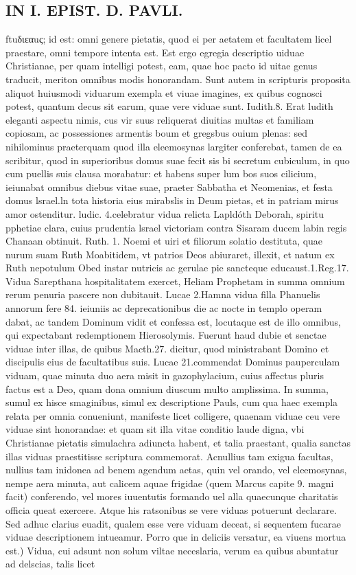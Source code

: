 \documentclass{article}
\begin{document}
\begin{pages}
\section*{IN I. EPIST. D. PAVLI. }
\marginpar{[ p.107 ]}\pstart ftuδιεαuς; id est: omni genere pietatis, quod ei per aetatem et facultatem licel praestare, omni tempore intenta est. Est ergo egregia descriptio uiduae Christianae, per quam intelligi potest, eam, quae hoc pacto id uitae genus traducit, meriton omnibus modis honorandam. Sunt autem in scripturis proposita aliquot huiusmodi viduarum exempla et viuae imagines, ex quibus cognosci potest, quantum decus sit earum, quae vere viduae sunt. Iudith.8. Erat ludith eleganti aspectu nimis, cus vir suus reliquerat diuitias multas et familiam copiosam, ac possessiones armentis boum et gregsbus ouium plenas: sed nihilominus praeterquam quod illa eleemosynas largiter conferebat, tamen de ea scribitur, quod in superioribus domus suae fecit sis bi secretum cubiculum, in quo cum puellis suis clausa morabatur: et habens super lum bos suos cilicium, ieiunabat omnibus diebus vitae suae, praeter Sabbatha et Neomenias, et festa domus lsrael.ln tota historia eius mirabslis in Deum pietas, et in patriam mirus amor ostenditur. ludic. 4.celebratur vidua relicta Lapldóth Deborah, spiritu pphetiae clara, cuius prudentia lsrael victoriam contra Sisaram ducem labin regis Chanaan obtinuit. Ruth. 1. Noemi et uiri et filiorum solatio destituta, quae nurum suam Ruth Moabitidem, vt patrios Deos abiuraret, illexit, et natum ex Ruth nepotulum Obed instar nutricis ac gerulae pie sancteque educaust.1.Reg.17. Vidua Sarepthana hospitalitatem exercet, Heliam Prophetam in summa omnium rerum penuria pascere non dubitauit. Lucae 2.Hamna vidua filla Phanuelis annorum fere 84. ieiuniis ac deprecationibus die ac nocte in templo operam dabat, ac tandem Dominum vidit et confessa est, locutaque est de illo omnibus, qui expectabant redemptionem Hierosolymis. Fuerunt haud dubie et senctae viduae inter illas, de quibus Macth.27. dicitur, quod ministrabant Domino et discipulis eius de facultatibus suis. Lucae 21.commendat Dominus pauperculam viduam, quae minuta duo aera misit in gazophylacium, cuius affectus pluris factus est a Deo, quam dona omnium diuscum multo amplissima. In summa, sumul ex hisce smaginibus, simul ex descriptione Pauls, cum qua haec exempla relata per omnia conueniunt, manifeste licet colligere, quaenam viduae ceu vere viduae sint honorandae: et quam sit illa vitae conditio laude digna, vbi Christianae pietatis simulachra adiuncta habent, et talia praestant, qualia sanctas illas viduas praestitisse scriptura commemorat. Acnullius tam exigua facultas, nullius tam inidonea ad benem agendum aetas, quin vel orando, vel eleemosynas, nempe aera minuta, aut calicem aquae frigidae (quem Marcus capite 9. magni facit) conferendo, vel mores iuuentutis formando uel alla quaecunque charitatis officia queat exercere. Atque his ratsonibus se vere viduas potuerunt declarare. Sed adhuc clarius euadit, qualem esse vere viduam deceat, si sequentem fucarae viduae descriptionem intueamur.  \pend\pstart Porro que in deliciis versatur, ea viuens mortua est.) Vidua, cui adsunt non solum viltae neceslaria, verum ea quibus abuntatur ad delscias, talis licet 
\end{pages}
\end{document}
